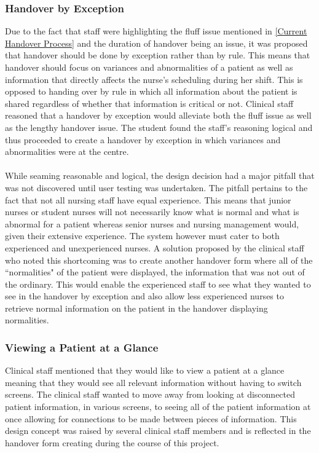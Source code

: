 \subsubsection{Handover by Exception}
Due to the fact that staff were highlighting the fluff issue mentioned in \ref{Current Handover Process} and the duration of handover being an issue, it was proposed that handover should be done by exception rather than by rule. This means that handover should focus on variances and abnormalities of a patient as well as information that directly affects the nurse's scheduling during her shift. This is opposed to handing over by rule in which all information about the patient is shared regardless of whether that information is critical or not. Clinical staff reasoned that a handover by exception would alleviate both the fluff issue as well as the lengthy handover issue. The student found the staff's reasoning logical and thus proceeded to create a handover by exception in which variances and abnormalities were at the centre.
\\ \\
While seaming reasonable and logical, the design decision had a major pitfall that was not discovered until user testing was undertaken. The pitfall pertains to the fact that not all nursing staff have equal experience. This means that junior nurses or student nurses will not necessarily know what is normal and what is abnormal for a patient whereas senior nurses and nursing management would, given their extensive experience. The system however must cater to both experienced and unexperienced nurses. A solution proposed by the clinical staff who noted this shortcoming was to create another handover form where all of the ``normalities" of the patient were displayed, the information that was not out of the ordinary. This would enable the experienced staff to see what they wanted to see in the handover by exception and also allow less experienced nurses to retrieve normal information on the patient in the handover displaying normalities. 

\subsubsection{Viewing a Patient at a Glance}
Clinical staff mentioned that they would like to view a patient at a glance meaning that they would see all relevant information without having to switch screens. The clinical staff wanted to move away from looking at disconnected patient information, in various screens, to seeing all of the patient information at once allowing for connections to be made between pieces of information. This design concept was raised by several clinical staff members and is reflected in the handover form creating during the course of this project. 

